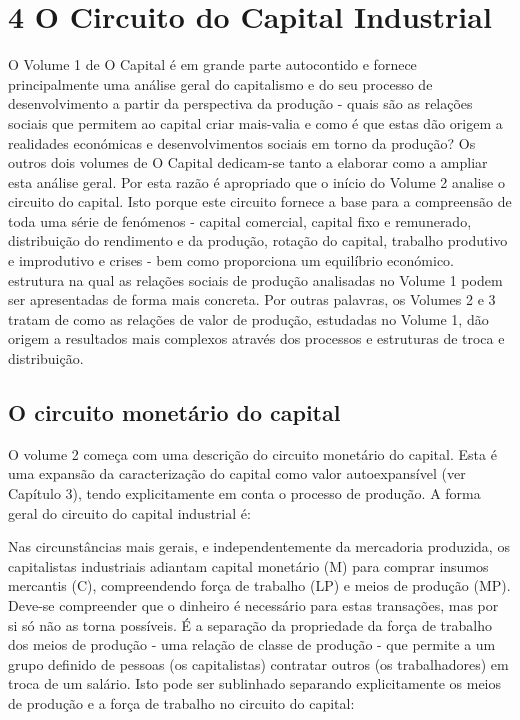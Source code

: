 \chapter{4 O Circuito do Capital Industrial}\label{4 O Circuito do Capital Industrial}
 \par 
O Volume {\color{blue}1} de O Capital é em grande parte autocontido e fornece principalmente uma análise geral do capitalismo e do seu processo de desenvolvimento a partir da perspectiva da produção - quais são as relações sociais que permitem ao capital criar mais-valia e como é que estas dão origem a realidades económicas e desenvolvimentos sociais em torno da produção? Os outros dois volumes de O Capital dedicam-se tanto a elaborar como a ampliar esta análise geral. Por esta razão é apropriado que o início do Volume {\color{blue}2} analise o circuito do capital. Isto porque este circuito fornece a base para a compreensão de toda uma série de fenómenos - capital comercial, capital fixo e remunerado, distribuição do rendimento e da produção, rotação do capital, trabalho produtivo e improdutivo e crises - bem como proporciona um equilíbrio económico. estrutura na qual as relações sociais de produção analisadas no Volume {\color{blue}1} podem ser apresentadas de forma mais concreta. Por outras palavras, os Volumes {\color{blue}2} e {\color{blue}3} tratam de como as relações de valor de produção, estudadas no Volume 1, dão origem a resultados mais complexos através dos processos e estruturas de troca e distribuição.
 \par 
\section{O circuito monetário do capital}
 \par 
O volume {\color{blue}2} começa com uma descrição do circuito monetário do capital. Esta é uma expansão da caracterização do capital como valor autoexpansível (ver Capítulo {\color{blue}3}), tendo explicitamente em conta o processo de produção. A forma geral do circuito do capital industrial é:
 \par 
Nas circunstâncias mais gerais, e independentemente da mercadoria produzida, os capitalistas industriais adiantam capital monetário (M) para comprar insumos mercantis (C), compreendendo força de trabalho (LP) e meios de produção (MP). Deve-se compreender que o dinheiro é necessário para estas transações, mas por si só não as torna possíveis. É a separação da propriedade da força de trabalho dos meios de produção - uma relação de classe de produção - que permite a um grupo definido de pessoas (os capitalistas) contratar outros (os trabalhadores) em troca de um salário. Isto pode ser sublinhado separando explicitamente os meios de produção e a força de trabalho no circuito do capital:
 \par 
